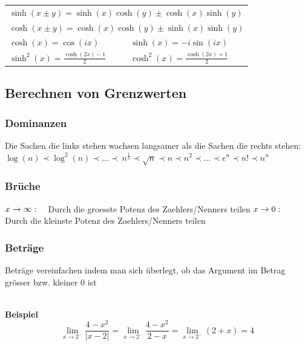 \documentclass[a4paper, fontsize = 8pt, landscape]{scrartcl}
\newenvironment {example}
				{\begin{itshape} \begin{small}}
				{\end{small} \end{itshape}}
\begin{document}
\begin{multicols*}{3}
    \begin{center}
        \renewcommand{\arraystretch}{1.5}
        \begin{tabular}{l l} \toprule
            \multicolumn{2}{l}{$\sinh(x \pm y) = \sinh(x) \cosh(y) \pm \cosh(x) \sinh(y)$} \\
            \multicolumn{2}{l}{$\cosh(x \pm y) = \cosh(x) \cosh(y) \pm \sinh(x) \sinh(y)$} \\
            \midrule
            $\cosh(x) = \cos(ix)$              & $\sinh(x) = -i \sin(ix)$                  \\
            \midrule
            $\sinh^2(x)=\frac{\cosh(2x)-1}{2}$ & $\cosh^2(x)=\frac{\cosh(2x)+1}{2}$        \\
            \bottomrule
        \end{tabular}
    \end{center}


    \subsection{Berechnen von Grenzwerten}
    \subsubsection{Dominanzen}
    Die Sachen die links stehen wachsen langsamer als die Sachen die rechts stehen:\\
    $\log{(n)}\prec\log^2{(n)}\prec\dots\prec\ n^{\frac{1}{3}}\prec\sqrt{n}\prec n\prec n^2\prec\dots\prec e^n\prec n!\prec n^n$
    \subsubsection{Brüche}
    \begin{center}
        $x \rightarrow \infty : \hspace*{10pt}$ Durch die groesste Potenz des Zaehlers/Nenners teilen
        $x \rightarrow 0 : \hspace*{10pt}$ Durch die kleinste Potenz des Zaehlers/Nenners teilen
    \end{center}
    \subsubsection{Beträge}
    Beträge vereinfachen indem man sich überlegt, ob das Argument im Betrag grösser bzw. kleiner 0 ist\\\\
    \begin{example}
        \textbf{Beispiel}
        \begin{equation*}
            \lim_{x \rightarrow 2^-} \frac{4-x^2}{\vert x-2 \vert} = \lim_{x \rightarrow 2^-} \frac{4-x^2}{2-x} = \lim_{x \rightarrow 2^-} (2+x) = 4
        \end{equation*}
    \end{example}

\end{multicols*}
\end{document}
